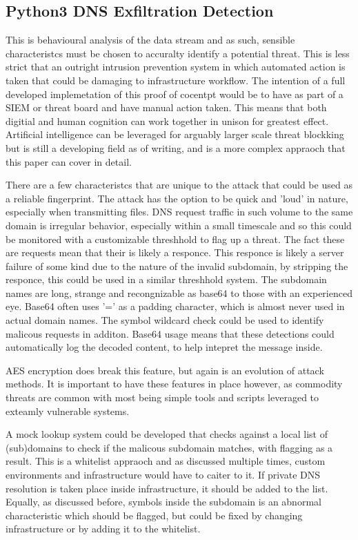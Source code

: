 \subsection{Python3 DNS Exfiltration Detection}
This is behavioural analysis of the data stream and as such, sensible characteristcs must be chosen to accuralty identify a potential threat. This is less strict that an outright intrusion prevention system in which automated action is taken that could be damaging to infrastructure workflow. The intention of a full developed implemetation of this proof of cocentpt would be to have as part of a SIEM or threat board and have manual action taken. This means that both digitial and human cognition can work together in unison for greatest effect.
Artificial intelligence can be leveraged for arguably larger scale threat blockking but is still a developing field as of writing, and is a more complex appraoch that this paper can cover in detail.

There are a few characteristcs that are unique to the attack that could be used as a reliable fingerprint. The attack has the option to be quick and 'loud' in nature, especially when transmitting files. DNS request traffic in such volume to the same domain is irregular behavior, especially within a small timescale and so this could be monitored with a customizable threshhold to flag up a threat.
The fact these are requests mean that their is likely a responce. This responce is likely a server failure of some kind due to the nature of the invalid subdomain, by stripping the responce, this could be used in a similar threshhold system. The subdomain names are long, strange and recongnizable as base64 to those with an experienced eye. Base64 often uses '=' as a padding character, which is almost never used in actual domain names. The symbol wildcard check could be used to identify malicous requests in additon. Base64 usage means that these detections could automatically log the decoded content, to help intepret the message inside.

AES encryption does break this feature, but again is an evolution of attack methods. It is important to have these features in place however, as commodity threats are common with most being simple tools and scripts leveraged to exteamly vulnerable systems. 

A mock lookup system could be developed that checks against a local list of (sub)domains to check if the malicous subdomain matches, with flagging as a result. This is a whitelist appraoch and as discussed multiple times, custom environments and infrastructure would have to caiter to it. If private DNS resolution is taken place inside infrastructure, it should be added to the list. Equally, as discussed before, symbols inside the subdomain is an abnormal characteristic which should be flagged, but could be fixed by changing infrastructure or by adding it to the whitelist. 

